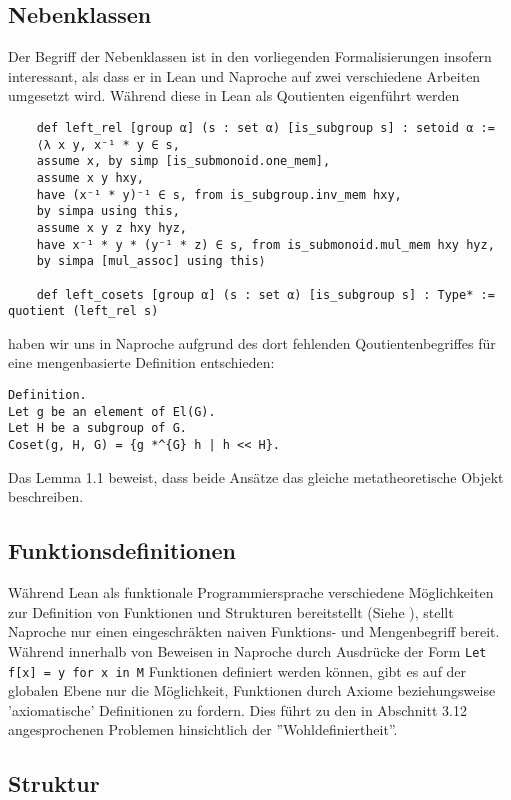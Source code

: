 \documentclass[a4paper,12pt]{scrartcl}
\begin{document}
\subsection{Nebenklassen}

Der Begriff der Nebenklassen ist in den vorliegenden Formalisierungen insofern interessant, als dass er in Lean und Naproche auf zwei verschiedene Arbeiten umgesetzt wird. 
Während diese in Lean als Qoutienten eigenführt werden 
\lstset{language = lean}
\begin{lstlisting}
	def left_rel [group α] (s : set α) [is_subgroup s] : setoid α :=
	⟨λ x y, x⁻¹ * y ∈ s,
	assume x, by simp [is_submonoid.one_mem],
	assume x y hxy,
	have (x⁻¹ * y)⁻¹ ∈ s, from is_subgroup.inv_mem hxy,
	by simpa using this,
	assume x y z hxy hyz,
	have x⁻¹ * y * (y⁻¹ * z) ∈ s, from is_submonoid.mul_mem hxy hyz,
	by simpa [mul_assoc] using this⟩
	
	def left_cosets [group α] (s : set α) [is_subgroup s] : Type* := quotient (left_rel s)
    \end{lstlisting} haben wir uns in Naproche aufgrund des dort fehlenden Qoutientenbegriffes für eine mengenbasierte Definition entschieden:

\lstset{language = ftl}
    \begin{lstlisting}
Definition.
Let g be an element of El(G).
Let H be a subgroup of G.
Coset(g, H, G) = {g *^{G} h | h << H}.
    \end{lstlisting}

Das Lemma 1.1 beweist, dass beide Ansätze das gleiche metatheoretische Objekt beschreiben.
\subsection{Funktionsdefinitionen}

Während Lean als funktionale Programmiersprache verschiedene Möglichkeiten zur Definition von Funktionen und Strukturen bereitstellt (Siehe \cite{bibtex.e}), stellt Naproche nur einen eingeschräkten naiven Funktions- und Mengenbegriff bereit. Während innerhalb von Beweisen in Naproche durch Ausdrücke der Form \lstset{language = ftl} \lstinline{Let f[x] = y for x in M} Funktionen definiert werden können, gibt es auf der globalen Ebene nur die Möglichkeit, Funktionen durch Axiome beziehungsweise 'axiomatische' Definitionen zu fordern. Dies führt zu den in Abschnitt 3.12 angesprochenen Problemen hinsichtlich der ''Wohldefiniertheit''.

\subsection{Struktur}
\end{document}
